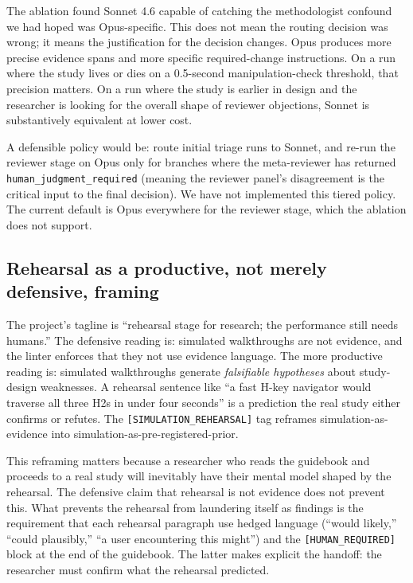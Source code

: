 The ablation found Sonnet 4.6 capable of catching the methodologist confound we had hoped was Opus-specific. This does not mean the routing decision was wrong; it means the justification for the decision changes. Opus produces more precise evidence spans and more specific required-change instructions. On a run where the study lives or dies on a 0.5-second manipulation-check threshold, that precision matters. On a run where the study is earlier in design and the researcher is looking for the overall shape of reviewer objections, Sonnet is substantively equivalent at lower cost.

A defensible policy would be: route initial triage runs to Sonnet, and re-run the reviewer stage on Opus only for branches where the meta-reviewer has returned \texttt{human\_judgment\_required} (meaning the reviewer panel's disagreement is the critical input to the final decision). We have not implemented this tiered policy. The current default is Opus everywhere for the reviewer stage, which the ablation does not support.

\subsection{Rehearsal as a productive, not merely defensive, framing}

The project's tagline is ``rehearsal stage for research; the performance still needs humans.'' The defensive reading is: simulated walkthroughs are not evidence, and the linter enforces that they not use evidence language. The more productive reading is: simulated walkthroughs generate \emph{falsifiable hypotheses} about study-design weaknesses. A rehearsal sentence like ``a fast H-key navigator would traverse all three H2s in under four seconds'' is a prediction the real study either confirms or refutes. The \texttt{[SIMULATION\_REHEARSAL]} tag reframes simulation-as-evidence into simulation-as-pre-registered-prior.

This reframing matters because a researcher who reads the guidebook and proceeds to a real study will inevitably have their mental model shaped by the rehearsal. The defensive claim that rehearsal is not evidence does not prevent this. What prevents the rehearsal from laundering itself as findings is the requirement that each rehearsal paragraph use hedged language (``would likely,'' ``could plausibly,'' ``a user encountering this might'') and the \texttt{[HUMAN\_REQUIRED]} block at the end of the guidebook. The latter makes explicit the handoff: the researcher must confirm what the rehearsal predicted.
